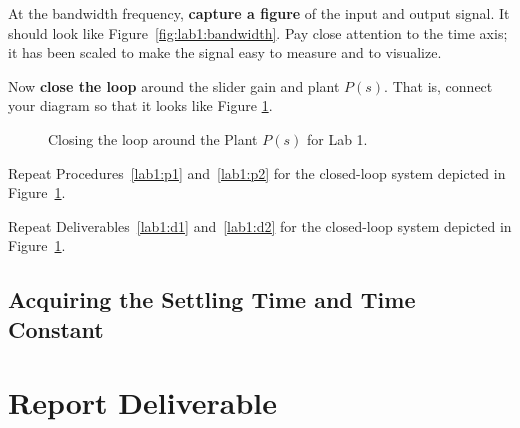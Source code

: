 %
\begin{deliverable}
  At the bandwidth frequency,
  \textbf{capture a figure} of the input and output signal. It should look
  like Figure~\ref{fig:lab1:bandwidth}. Pay close attention to the time
  axis; it has been scaled to make the signal easy to measure and to visualize.
  \label{lab1:d2}
\end{deliverable}
%
Now \textbf{close the loop} around the slider gain and plant \(P(s).\) That
is, connect your diagram so that it looks like Figure
\ref{fig:lab1:closing-loop}.
%
\begin{figure}
  \centering
  \caption{
    Closing the loop around the Plant \(P(s)\) for Lab 1.
  }
  \label{fig:lab1:closing-loop}
\end{figure}
%
\begin{procedure}
  Repeat Procedures~\ref{lab1:p1} and~\ref{lab1:p2} for the closed-loop
  system depicted in Figure~\ref{fig:lab1:closing-loop}.
\end{procedure}
%
\begin{deliverable}
  Repeat Deliverables~\ref{lab1:d1} and~\ref{lab1:d2} for the closed-loop
  system depicted in Figure~\ref{fig:lab1:closing-loop}.
\end{deliverable}

\subsection{Acquiring the Settling Time and Time Constant}


\section{Report Deliverable}

